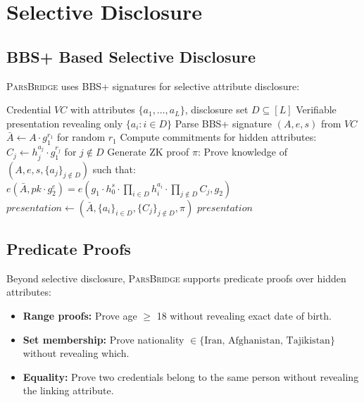 \documentclass[11pt,a4paper]{article}
\newcommand{\bridge}{\textsc{ParsBridge}\xspace}
\begin{document}
\section{Selective Disclosure}

\subsection{BBS+ Based Selective Disclosure}

\bridge uses BBS+ signatures for selective attribute disclosure:

\begin{algorithm}[H]
\caption{Selective Disclosure Presentation}
\label{alg:selective}
\begin{algorithmic}[1]
\Require Credential $VC$ with attributes $\{a_1, \ldots, a_L\}$, disclosure set $D \subseteq [L]$
\Ensure Verifiable presentation revealing only $\{a_i : i \in D\}$
\State Parse BBS+ signature $(A, e, s)$ from $VC$
\State $\bar{A} \leftarrow A \cdot g_1^{r_1}$ for random $r_1$ 
\State Compute commitments for hidden attributes: $C_j \leftarrow h_j^{a_j} \cdot g_1^{r_j}$ for $j \notin D$
\State Generate ZK proof $\pi$:
\State \quad Prove knowledge of $(A, e, s, \{a_j\}_{j \notin D})$ such that:
\State \quad\quad $e(\bar{A}, pk \cdot g_2^e) = e(g_1 \cdot h_0^s \cdot \prod_{i \in D} h_i^{a_i} \cdot \prod_{j \notin D} C_j, g_2)$
\State $\mathit{presentation} \leftarrow (\bar{A}, \{a_i\}_{i \in D}, \{C_j\}_{j \notin D}, \pi)$
\State \Return $\mathit{presentation}$
\end{algorithmic}
\end{algorithm}

\subsection{Predicate Proofs}

Beyond selective disclosure, \bridge supports predicate proofs over hidden attributes:

\begin{itemize}
    \item \textbf{Range proofs:} Prove age $\geq$ 18 without revealing exact date of birth.
    \item \textbf{Set membership:} Prove nationality $\in \{\text{Iran, Afghanistan, Tajikistan}\}$ without revealing which.
    \item \textbf{Equality:} Prove two credentials belong to the same person without revealing the linking attribute.
\end{itemize}
\end{document}
